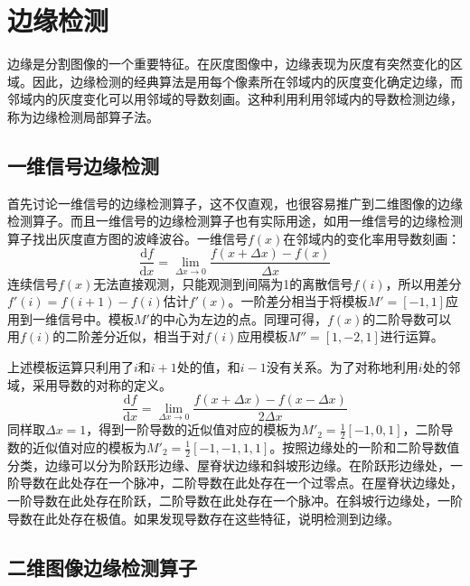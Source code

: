 \section{边缘检测}

边缘是分割图像的一个重要特征。在灰度图像中，边缘表现为灰度有突然变化的区域。因此，边缘检测的经典算法是用每个像素所在邻域内的灰度变化确定边缘，而邻域内的灰度变化可以用邻域的导数刻画。这种利用利用邻域内的导数检测边缘，称为边缘检测局部算子法。

\subsection{一维信号边缘检测}

首先讨论一维信号的边缘检测算子，这不仅直观，也很容易推广到二维图像的边缘检测算子。而且一维信号的边缘检测算子也有实际用途，如用一维信号的边缘检测算子找出灰度直方图的波峰波谷。一维信号$f(x)$在邻域内的变化率用导数刻画：
\begin{equation}
  \label{eq:diff}
  \frac{\mathrm{d}f}{\mathrm{d}x}=\lim_{\Delta x\to 0}\frac{f(x+\Delta x)-f(x)}{\Delta x}
\end{equation}
连续信号$f(x)$无法直接观测，只能观测到间隔为1的离散信号$f(i)$，所以用差分$f'(i)=f(i+1)-f(i)$估计$f'(x)$。一阶差分相当于将模板$M'=[-1,1]$应用到一维信号中。模板$M'$的中心为左边的点。同理可得，$f(x)$的二阶导数可以用$f(i)$的二阶差分近似，相当于对$f(i)$应用模板$M''=[1,-2,1]$进行运算。

上述模板运算只利用了$i$和$i+1$处的值，和$i-1$没有关系。为了对称地利用$i$处的邻域，采用导数的对称的定义。
\begin{equation}
  \label{eq:diff2}
  \frac{\mathrm{d}f}{\mathrm{d}x}=\lim_{\Delta x\to 0}\frac{f(x+\Delta x)-f(x-\Delta x)}{2\Delta x}
\end{equation}
同样取$\Delta x=1$，得到一阶导数的近似值对应的模板为$M'_2=\frac{1}{2}[-1,0,1]$，二阶导数的近似值对应的模板为$M'_2=\frac{1}{2}[-1,-1,1,1]$。按照边缘处的一阶和二阶导数值分类，边缘可以分为阶跃形边缘、屋脊状边缘和斜坡形边缘。在阶跃形边缘处，一阶导数在此处存在一个脉冲，二阶导数在此处存在一个过零点。在屋脊状边缘处，一阶导数在此处存在阶跃，二阶导数在此处存在一个脉冲。在斜坡行边缘处，一阶导数在此处存在极值。如果发现导数存在这些特征，说明检测到边缘。

\subsection{二维图像边缘检测算子}


